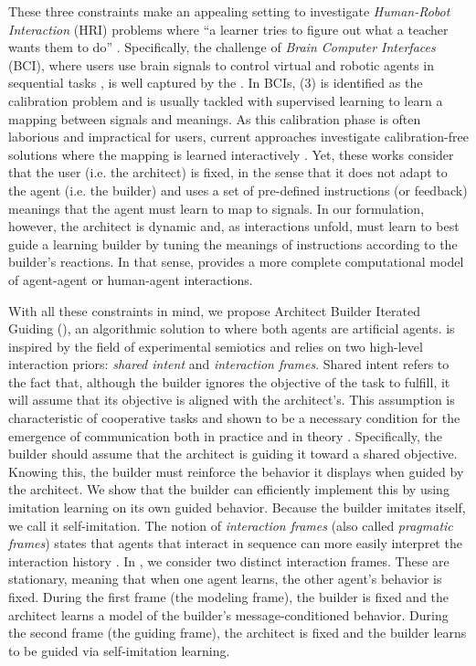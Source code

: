 These three constraints make \abp an appealing setting to investigate \textit{Human-Robot Interaction} (HRI) \citep{goodrich2008human} problems where ``a learner tries to figure out what a teacher wants them to do'' \citep{grizou2013robot,cederborg2014social}. Specifically, the challenge of \textit{Brain Computer Interfaces} (BCI), where users use brain signals to control virtual and robotic agents in sequential tasks \citep{Katyal2014,deBettencourt2015ClosedloopTO,Mishra2015ClosedloopCT,MUNOZMOLDES2020681,Chiang2021Closed}, is well captured by the \abp.
In BCIs, (3) is identified as the calibration problem and is usually tackled with supervised learning to learn a mapping between signals and meanings. As this calibration phase is often laborious and impractical for users, current approaches investigate calibration-free solutions where the mapping is learned interactively \citep{grizou:hal-00984068,xie2021interaction}.
Yet, these works consider that the user (i.e. the architect) is fixed, in the sense that it does not adapt to the agent (i.e. the builder) and uses a set of pre-defined instructions (or feedback) meanings that the agent must learn to map to signals. In our \abp formulation, however, the architect is dynamic and, as interactions unfold, must learn to best guide a learning builder by tuning the meanings of instructions according to the builder's reactions. In that sense, \abp provides a more complete computational model of agent-agent or human-agent interactions. 

With all these constraints in mind, we propose Architect Builder Iterated Guiding (\abig), an algorithmic solution to \abp where both agents are artificial agents. \abig is inspired by the field of experimental semiotics and relies on two high-level interaction priors: \emph{shared intent} and \emph{interaction frames}. Shared intent refers to the fact that, although the builder ignores the objective of the task to fulfill, it will assume that its objective is aligned with the architect's. This assumption is characteristic of cooperative tasks and shown to be a necessary condition for the emergence of communication both in practice \citep{foerster2016learning, cao2018emergent} and in theory \citep{crawford1982strategic}. Specifically, the builder should assume that the architect is guiding it toward a shared objective. Knowing this, the builder must reinforce the behavior it displays when guided by the architect. We show that the builder can efficiently implement this by using imitation learning on its own guided behavior. Because the builder imitates itself, we call it self-imitation.  The notion of \emph{interaction frames} (also called \emph{pragmatic frames}) states that agents that interact in sequence can more easily interpret the interaction history \citep{bruner1985child,vollmer2016pragmatic}. In \abig, we consider two distinct interaction frames. These are stationary, meaning that when one agent learns, the other agent’s behavior is fixed. During the first frame (the modeling frame), the builder is fixed and the architect learns a model of the builder's message-conditioned behavior. During the second frame (the guiding frame), the architect is fixed and the builder learns to be guided via self-imitation learning. 

